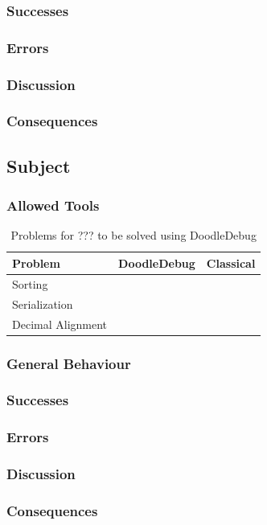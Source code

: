 \documentclass[a4paper,ngerman,english]{amsbook} %
\begin{document}
\subsubsection*{Successes}
\subsubsection*{Errors}
\subsubsection*{Discussion}
\subsubsection*{Consequences}

\subsection*{Subject}
\subsubsection*{Allowed Tools}
\begin{table}[h]
\centering
\begin{tabular}{l c c}
{\bf Problem} & {\bf DoodleDebug} & {\bf Classical} \\ \hline
Sorting &  &  \\
Serialization &  &  \\
Decimal Alignment &  &  \\
\end{tabular}
\caption{Problems for ??? to be solved using DoodleDebug}
\end{table}
\subsubsection*{General Behaviour}
\subsubsection*{Successes}
\subsubsection*{Errors}
\subsubsection*{Discussion}
\subsubsection*{Consequences}
\end{document}
